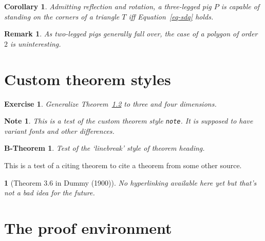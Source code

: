 \documentclass[
  letterpaper,
  DIV=11,
  numbers=noendperiod]{scrartcl}
\theoremstyle{plain}
\theoremstyle{plain}
\theoremstyle{plain}
\theoremstyle{plain}
\newtheorem{corollary}[theorem]{Corollary}
\theoremstyle{plain}
\newtheorem*{remark}{Remark}
\theoremstyle{exercise}
\newtheorem{exercise}{Exercise}
\theoremstyle{note}
\newtheorem{note}{Note}
\theoremstyle{break}
\newtheorem{bthm}{B-Theorem}
\theoremstyle{citing}
\newtheorem*{varthm}{}
\begin{document}
\begin{corollary}

Admitting reflection and rotation, a three-legged pig \(P\) is capable
of standing on the corners of a triangle \(T\) iff Equation~\ref{eq-sdq}
holds.

\end{corollary}

\begin{remark}

As two-legged pigs generally fall over, the case of a polygon of order
\(2\) is uninteresting.

\end{remark}

\hypertarget{custom-theorem-styles}{%
\section{Custom theorem styles}\label{custom-theorem-styles}}

\begin{exercise}

Generalize Theorem~\protect\hyperlink{pigspan}{1.2} to three and four
dimensions.

\end{exercise}

\begin{note}

This is a test of the custom theorem style \texttt{note}. It is supposed
to have variant fonts and other differences.

\end{note}

\begin{bthm}

Test of the `linebreak' style of theorem heading.

\end{bthm}

This is a test of a citing theorem to cite a theorem from some other
source.

\begin{varthm}[Theorem 3.6 in Dummy (1900)]

No hyperlinking available here yet but that's not a bad idea for the
future.

\end{varthm}

\hypertarget{the-proof-environment}{%
\section{The proof environment}\label{the-proof-environment}}
\end{document}
